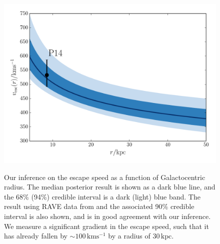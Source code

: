 \documentclass[useAMS,twocolumn,usenatbib]{mn2e}
\def\kpc{{\,\mathrm{kpc}}}
\def\kms{{\,\mathrm{kms^{-1}}}}
\begin{document}
\begin{figure}
\includegraphics[width=\columnwidth]{plots/vesc_posterior}\\
\caption{Our inference on the escape speed as a function of 
Galactocentric radius. The median posterior result is shown as a {}
dark blue line, and the 68\% (94\%) credible interval is a dark (light) 
blue band. The result using RAVE data from \citet{Pi14} and the associated 90\% credible 
interval is also shown, and is in good agreement with our inference. We 
measure a significant gradient in the escape speed, such that it has 
already fallen by $\sim 100\kms$ by  a radius of $30\kpc$.}
\label{fig:vesc_posterior}
\end{figure}
\end{document}

